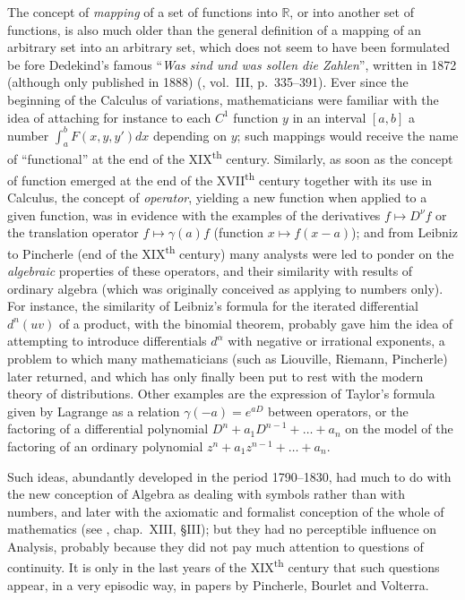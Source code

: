 \documentclass[12pt,a4paper,leqno,twoside]{extbook}
\newcommand{\supth}{\texorpdfstring{\textsuperscript{th}}{th}}
\newcommand{\R}{\mathbb{R}}
\begin{document}
The concept of \emph{mapping} of a set of functions into \(\R\), or into another set of functions, is also much older than the general definition of a mapping of an arbitrary set into an arbitrary set, which does not seem to have been formulated be fore Dedekind's famous ``\emph{Was sind und was sollen die Zahlen}'', written in 1872 (although only published in 1888) (\cite{048}, vol.~III, p.~335--391). Ever since the beginning of the Calculus of variations, mathematicians were familiar with the idea of attaching for instance to each \(C^1\) function \(y\) in an interval \([a, b]\) a number \(\int_a^b F(x,y,y')dx\) depending on \(y\); such mappings would receive the name of ``functional'' at the end of the XIX\supth{} century. Similarly, as soon as the concept of function emerged at the end of the XVII\supth{} century together with its use in Calculus, the concept of \emph{operator}, yielding a new function when applied to a given function, was in evidence with the examples of the derivatives \(f \mapsto D^\nu f\) or the translation operator \(f \mapsto \gamma(a)f\) (function \(x \mapsto f(x - a)\)); and from Leibniz to Pincherle (end of the XIX\supth{} century) many analysts were led to ponder on the \emph{algebraic} properties of these operators, and their similarity with results of ordinary algebra (which was originally conceived as applying to numbers only). For instance, the similarity of Leibniz's formula for the iterated differential \(d^n(uv)\) of a product, with the binomial theorem, probably gave him the idea of attempting to introduce differentials \(d^\alpha\) with negative or irrational exponents, a problem to which many mathematicians (such as Liouville, Riemann, Pincherle) later returned, and which has only finally been put to rest with the modern theory of distributions. Other examples are the expression of Taylor's formula given by Lagrange as a relation \(\gamma(-a) = e^{aD}\) between operators, or the factoring of a differential polynomial \(D^n + a_1 D^{n-1} + \ldots + a_n\) on the model of the factoring of an ordinary polynomial \(z^n + a_1 z^{n-1} + \ldots + a_n\).

Such ideas, abundantly developed in the period 1790--1830, had much to do with the new conception of Algebra as dealing with symbols rather than with numbers, and later with the axiomatic and formalist conception of the whole of mathematics (see \cite{054}, chap.~XIII, \S III); but they had no perceptible influence on Analysis, probably because they did not pay much attention to questions of continuity. It is only in the last years of the XIX\supth{} century that such questions appear, in a very episodic way, in papers by Pincherle, Bourlet and Volterra.
\end{document}
